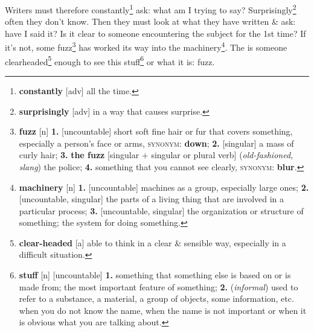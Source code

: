 \documentclass[oneside]{book}
\numberwithin{equation}{section}
\begin{document}
Writers must therefore constantly\footnote{\textbf{constantly} [adv] all the time.} ask: what am I trying to say? Surprisingly\footnote{\textbf{surprisingly} [adv] in a way that causes surprise.} often they don't know. Then they must look at what they have written \& ask: have I said it? Is it clear to someone encountering the subject for the 1st time? If it's not, some fuzz\footnote{\textbf{fuzz} [n] \textbf{1.} [uncountable] short soft fine hair or fur that covers something, especially a person's face or arms, \textsc{synonym}: \textbf{down}; \textbf{2.} [singular] a mass of curly hair; \textbf{3.} \textbf{the fuzz} [singular $+$ singular or plural verb] (\textit{old-fashioned, slang}) the police; \textbf{4.} something that you cannot see clearly, \textsc{synonym}: \textbf{blur}.} has worked its way into the machinery\footnote{\textbf{machinery} [n] \textbf{1.} [uncountable] machines as a group, especially large ones; \textbf{2.} [uncountable, singular] the parts of a living thing that are involved in a particular process; \textbf{3.} [uncountable, singular] the organization or structure of something; the system for doing something.}. The  is someone clearheaded\footnote{\textbf{clear-headed} [a] able to think in a clear \& sensible way, especially in a difficult situation.} enough to see this stuff\footnote{\textbf{stuff} [n] [uncountable] \textbf{1.} something that something else is based on or is made from; the most important feature of something; \textbf{2.} (\textit{informal}) used to refer to a substance, a material, a group of objects, some information, etc. when you do not know the name, when the name is not important or when it is obvious what you are talking about.} or what it is: fuzz.
\end{document}
